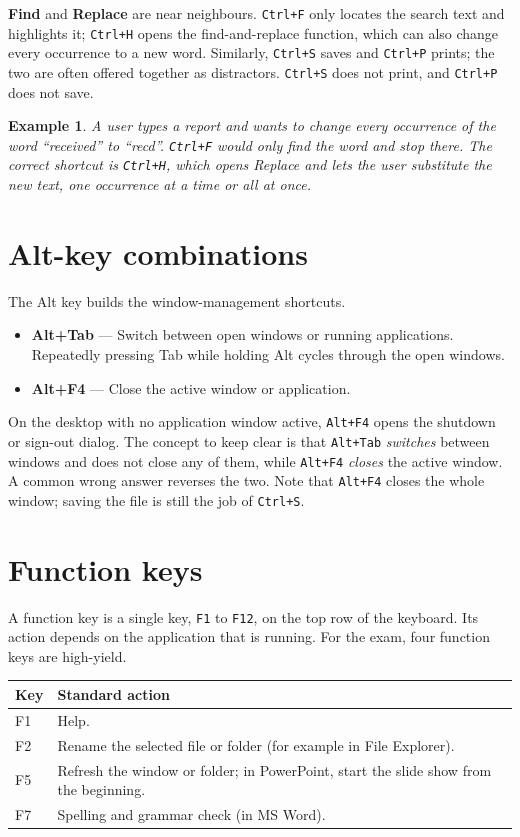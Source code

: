 \documentclass[11pt]{article}
\newtheorem{example}{Example}[section]
\begin{document}
\textbf{Find} and \textbf{Replace} are near neighbours. \texttt{Ctrl+F} only
locates the search text and highlights it; \texttt{Ctrl+H} opens the
find-and-replace function, which can also change every occurrence to a new
word. Similarly, \texttt{Ctrl+S} saves and \texttt{Ctrl+P} prints; the two are
often offered together as distractors. \texttt{Ctrl+S} does not print, and
\texttt{Ctrl+P} does not save.

\begin{example}
A user types a report and wants to change every occurrence of the word
``received'' to ``recd''. \texttt{Ctrl+F} would only find the word and stop
there. The correct shortcut is \texttt{Ctrl+H}, which opens Replace and lets
the user substitute the new text, one occurrence at a time or all at once.
\end{example}

\section{Alt-key combinations}
The Alt key builds the window-management shortcuts.

\begin{itemize}
  \item \textbf{Alt+Tab} --- Switch between open windows or running
    applications. Repeatedly pressing Tab while holding Alt cycles through the
    open windows.
  \item \textbf{Alt+F4} --- Close the active window or application.
\end{itemize}

On the desktop with no application window active, \texttt{Alt+F4} opens the
shutdown or sign-out dialog. The concept to keep clear is that \texttt{Alt+Tab}
\emph{switches} between windows and does not close any of them, while
\texttt{Alt+F4} \emph{closes} the active window. A common wrong answer reverses
the two. Note that \texttt{Alt+F4} closes the whole window; saving the file is
still the job of \texttt{Ctrl+S}.

\section{Function keys}
A function key is a single key, \texttt{F1} to \texttt{F12}, on the top row of
the keyboard. Its action depends on the application that is running. For the
exam, four function keys are high-yield.

\begin{center}
\begin{tabular}{p{}p{}}
\toprule
\textbf{Key} & \textbf{Standard action} \\
\midrule
F1 & Help. \\
F2 & Rename the selected file or folder (for example in File Explorer). \\
F5 & Refresh the window or folder; in PowerPoint, start the slide show from
     the beginning. \\
F7 & Spelling and grammar check (in MS Word). \\
\bottomrule
\end{tabular}
\end{center}
\end{document}
